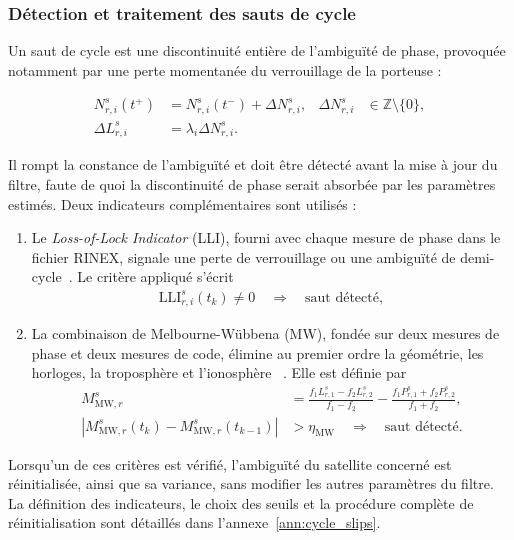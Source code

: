 \subsubsection{Détection et traitement des sauts de cycle}

Un saut de cycle est une discontinuité entière de l'ambiguïté de phase,
provoquée notamment par une perte momentanée du verrouillage de la porteuse :

\begin{align}
N_{r,i}^s(t^+)
&=N_{r,i}^s(t^-)+\Delta N_{r,i}^s,
&
\Delta N_{r,i}^s&\in\mathbb Z\setminus\{0\},
\\
\Delta L_{r,i}^s&=\lambda_i\Delta N_{r,i}^s.
\label{ppp:eq:cycle_slip_definition}
\end{align}

Il rompt la constance de l'ambiguïté et doit être détecté avant la mise à jour
du filtre, faute de quoi la discontinuité de phase serait absorbée par les
paramètres estimés. Deux indicateurs complémentaires sont utilisés :

\begin{enumerate}
    \item Le \textit{Loss-of-Lock Indicator} (LLI), fourni avec chaque mesure
    de phase dans le fichier RINEX, signale une perte de verrouillage ou une
    ambiguïté de demi-cycle~\cite{rinex304}. Le critère appliqué s'écrit
    \begin{align}
    \mathrm{LLI}_{r,i}^s(t_k)\neq 0
    \quad\Longrightarrow\quad
    \text{saut détecté},
    \label{ppp:eq:lli_detection}
    \end{align}
    
    \item La combinaison de Melbourne-Wübbena (MW), fondée sur deux mesures de
    phase et deux mesures de code, élimine au premier ordre la géométrie, les
    horloges, la troposphère et l'ionosphère
    ~\cite{melbourne1985,wubbena1985}. Elle est définie par
    \begin{align}
    M_{\mathrm{MW},r}^s
    &=
    \frac{f_1L_{r,1}^s-f_2L_{r,2}^s}{f_1-f_2}
    -
    \frac{f_1P_{r,1}^s+f_2P_{r,2}^s}{f_1+f_2},
    \\
    \left|M_{\mathrm{MW},r}^s(t_k)-M_{\mathrm{MW},r}^s(t_{k-1})\right|
    &>\eta_{\mathrm{MW}}
    \quad\Longrightarrow\quad
    \text{saut détecté}.
    \label{ppp:eq:melbourne_wubbena_detection}
    \end{align}
\end{enumerate}

Lorsqu'un de ces critères est vérifié, l'ambiguïté du satellite concerné est
réinitialisée, ainsi que sa variance, sans modifier les autres paramètres du
filtre. La définition des indicateurs, le choix des seuils et la procédure
complète de réinitialisation sont détaillés dans
l'annexe~\ref{ann:cycle_slips}.


